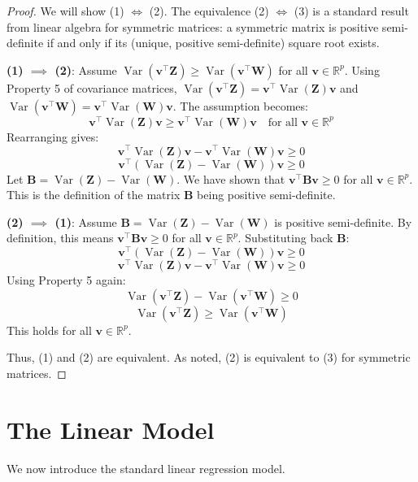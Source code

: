 \documentclass[11pt, a4paper]{article}
\DeclareMathOperator{\Var}{\mathrm{Var}}         %
\theoremstyle{definition}
\theoremstyle{remark}
\newcommand{\RR}{\mathbb{R}}             %
\newcommand{\mat}[1]{\mathbf{#1}}       %
\newcommand{\vect}[1]{\bm{#1}}          %
\newcommand{\transpose}{^{\top}}        %
\begin{document}
\begin{proof}
We will show (1) $\iff$ (2). The equivalence (2) $\iff$ (3) is a standard result from linear algebra for symmetric matrices: a symmetric matrix is positive semi-definite if and only if its (unique, positive semi-definite) square root exists.

\textbf{(1) $\implies$ (2)}:
Assume $\Var(\vect{v}\transpose \vect{Z}) \geq \Var(\vect{v}\transpose \vect{W})$ for all $\vect{v} \in \RR^p$.
Using Property 5 of covariance matrices, $\Var(\vect{v}\transpose \vect{Z}) = \vect{v}\transpose \Var(\vect{Z}) \vect{v}$ and $\Var(\vect{v}\transpose \vect{W}) = \vect{v}\transpose \Var(\vect{W}) \vect{v}$.
The assumption becomes:
\[ \vect{v}\transpose \Var(\vect{Z}) \vect{v} \geq \vect{v}\transpose \Var(\vect{W}) \vect{v} \quad \text{for all } \vect{v} \in \RR^p \]
Rearranging gives:
\[ \vect{v}\transpose \Var(\vect{Z}) \vect{v} - \vect{v}\transpose \Var(\vect{W}) \vect{v} \geq 0 \]
\[ \vect{v}\transpose (\Var(\vect{Z}) - \Var(\vect{W})) \vect{v} \geq 0 \]
Let $\mat{B} = \Var(\vect{Z}) - \Var(\vect{W})$. We have shown that $\vect{v}\transpose \mat{B} \vect{v} \geq 0$ for all $\vect{v} \in \RR^p$.
This is the definition of the matrix $\mat{B}$ being positive semi-definite.

\textbf{(2) $\implies$ (1)}:
Assume $\mat{B} = \Var(\vect{Z}) - \Var(\vect{W})$ is positive semi-definite.
By definition, this means $\vect{v}\transpose \mat{B} \vect{v} \geq 0$ for all $\vect{v} \in \RR^p$.
Substituting back $\mat{B}$:
\[ \vect{v}\transpose (\Var(\vect{Z}) - \Var(\vect{W})) \vect{v} \geq 0 \]
\[ \vect{v}\transpose \Var(\vect{Z}) \vect{v} - \vect{v}\transpose \Var(\vect{W}) \vect{v} \geq 0 \]
Using Property 5 again:
\[ \Var(\vect{v}\transpose \vect{Z}) - \Var(\vect{v}\transpose \vect{W}) \geq 0 \]
\[ \Var(\vect{v}\transpose \vect{Z}) \geq \Var(\vect{v}\transpose \vect{W}) \]
This holds for all $\vect{v} \in \RR^p$.

Thus, (1) and (2) are equivalent. As noted, (2) is equivalent to (3) for symmetric matrices.
\end{proof}

\section{The Linear Model}

We now introduce the standard linear regression model.
\end{document}
